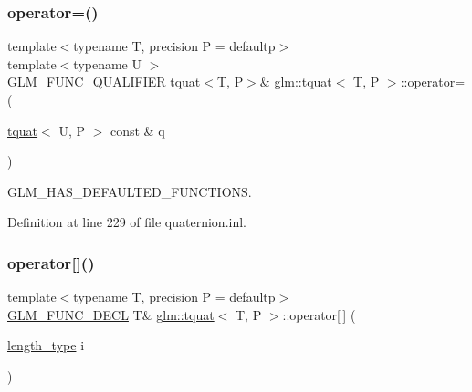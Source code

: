 \mbox{\label{structglm_1_1tquat_a280d36cd56dabfc93402adb201e87e63}} 
\subsubsection{\texorpdfstring{operator=()}{operator=()}\hspace{0.1cm}{\footnotesize\ttfamily [3/3]}}
{\footnotesize\ttfamily template$<$typename T, precision P = defaultp$>$ \\
template$<$typename U $>$ \\
\mbox{\hyperlink{setup_8hpp_a33fdea6f91c5f834105f7415e2a64407}{G\+L\+M\+\_\+\+F\+U\+N\+C\+\_\+\+Q\+U\+A\+L\+I\+F\+I\+ER}} \mbox{\hyperlink{structglm_1_1tquat}{tquat}}$<$T, P$>$\& \mbox{\hyperlink{structglm_1_1tquat}{glm\+::tquat}}$<$ T, P $>$\+::operator= (\begin{DoxyParamCaption}\item[{\mbox{\hyperlink{structglm_1_1tquat}{tquat}}$<$ U, P $>$ const \&}]{q }\end{DoxyParamCaption})}



G\+L\+M\+\_\+\+H\+A\+S\+\_\+\+D\+E\+F\+A\+U\+L\+T\+E\+D\+\_\+\+F\+U\+N\+C\+T\+I\+O\+NS. 



Definition at line 229 of file quaternion.\+inl.

\mbox{\label{structglm_1_1tquat_a7c9434d6e90ddc03ed8b91770765303c}} 
\subsubsection{\texorpdfstring{operator[]()}{operator[]()}\hspace{0.1cm}{\footnotesize\ttfamily [1/2]}}
{\footnotesize\ttfamily template$<$typename T, precision P = defaultp$>$ \\
\mbox{\hyperlink{setup_8hpp_ab2d052de21a70539923e9bcbf6e83a51}{G\+L\+M\+\_\+\+F\+U\+N\+C\+\_\+\+D\+E\+CL}} T\& \mbox{\hyperlink{structglm_1_1tquat}{glm\+::tquat}}$<$ T, P $>$\+::operator\mbox{[}$\,$\mbox{]} (\begin{DoxyParamCaption}\item[{\mbox{\hyperlink{structglm_1_1tquat_ab3ef67a20d129dcb01f042042218ba17}{length\+\_\+type}}}]{i }\end{DoxyParamCaption})}

